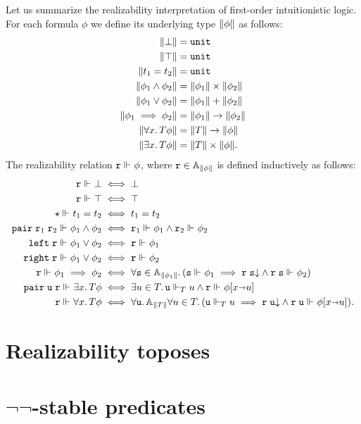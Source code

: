 Let us summarize the realizability interpretation of first-order
intuitionistic logic. For each formula $\phi$ we define its underlying
type $\T{\phi}$ as follows:
%
\begin{align*}
  \T{\bot} &= \unit \\
  \T{\top} &= \unit \\
  \T{t_1 = t_2} &= \unit \\
  \T{\phi_1 \land \phi_2} &= \T{\phi_1} \times \T{\phi_2}\\
  \T{\phi_1 \lor \phi_2} &= \T{\phi_1} + \T{\phi_2}\\
  \T{\phi_1 \implies \phi_2} &= \T{\phi_1} \to \T{\phi_2}\\
  \T{\all{x}{T}{\phi}} &= \T{T} \to \T{\phi} \\
  \T{\some{x}{T}{\phi}} &= \T{T} \times \T{\phi}.
\end{align*}
%
The realizability relation $\R{r} \rz \phi$, where $\R{r} \in
\Atyp{\T{\phi}}$ is defined inductively as follows:
%
\begin{align*}
  \R{r} \rz \bot &\iff \bot\\
  \R{r} \rz \top &\iff \top\\
  \ttunit \rz t_1 = t_2 &\iff t_1 = t_2\\
  \combPair\;\R{r}_1\;\R{r}_2 \rz \phi_1 \land \phi_2 &\iff
  \R{r}_1 \rz \phi_1 \land \R{r}_2 \rz \phi_2\\
  \combLeft\;\R{r} \rz \phi_1 \lor \phi_2 &\iff \R{r} \rz \phi_1\\
  \combRight\;\R{r} \rz \phi_1 \lor \phi_2 &\iff \R{r} \rz \phi_2\\
  \R{r} \rz \phi_1 \implies \phi_2 &\iff
  \all{\R{s} \in \Atyp{\T{\phi_1}}} (\R{s} \rz \phi_1 \implies
    \defined{\R{r}\;\R{s}} \land \R{r}\;\R{s} \rz \phi_2)
  \\
  \combPair\;\R{u}\;\R{r} \rz \some{x}{T}{\phi} &\iff
  \some{u \in T} \R{u} \rz[T] u \land \R{r} \rz \subst{\phi}{x \subto u}
  \\
  \R{r} \rz \all{x}{T}{\phi} &\iff
  \all{\R{u}}{\Atyp{\T{T}}}{
    \all{u \in T}
      (\R{u} \rz[T] u \implies
      \defined{\R{r}\;\R{u}} \land \R{r}\;\R{u} \rz \subst{\phi}{x \subto u})
    }.
\end{align*}
%

\section{Realizability toposes}
\label{sec:realizability-toposes}


\section[\texorpdfstring{$\neg\neg$-stable predicates}{Not-not-stable predicates}]{$\neg\neg$-stable predicates}
\label{sec:decidable-predicates}

